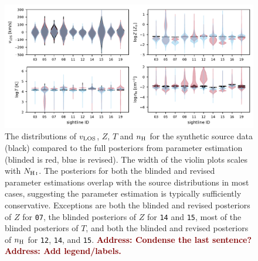 \documentclass[fleqn,usenatbib]{mnras}
\newcommand{\todo}[1]{\textcolor{Maroon}{\textbf{Address: #1}}}
\begin{document}
\begin{figure}
    \centering
    \includegraphics[width=\textwidth]{figures/sample2/violin.pdf}
    \caption{
    The distributions of $v_{\rm LOS}$, $Z$, $T$ and $n_{\rm H}$ for the synthetic source data (black) compared to the full posteriors from parameter estimation (blinded is red, blue is revised).
    The width of the violin plots scales with $N_{\ion{H}{I}}$.
    The posteriors for both the blinded and revised parameter estimations overlap with the source distributions in most cases, suggesting the parameter estimation is typically sufficiently conservative.
    Exceptions are
    both the blinded and revised posteriors of $Z$ for \texttt{07},
    the blinded posteriors of $Z$ for \texttt{14} and \texttt{15},
    most of the blinded posteriors of $T$,
    and both the blinded and revised posteriors of $n_{\rm H}$ for \texttt{12}, \texttt{14}, and \texttt{15}.
    \todo{Condense the last sentence?}
    \todo{Add legend/labels.}
    }
    \label{f: sample2 violin}
\end{figure}
\end{document}

